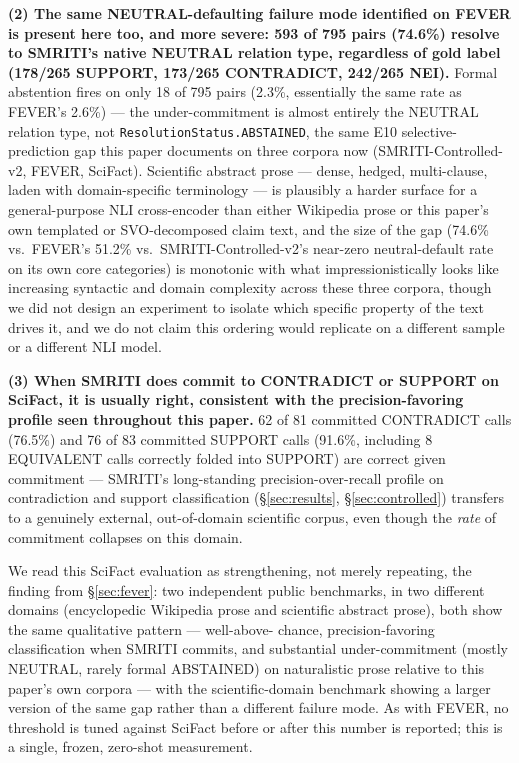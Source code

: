 \textbf{(2) The same NEUTRAL-defaulting failure mode identified on FEVER
is present here too, and more severe: 593 of 795 pairs (74.6\%) resolve
to SMRITI's native NEUTRAL relation type, regardless of gold label
(178/265 SUPPORT, 173/265 CONTRADICT, 242/265 NEI).} Formal abstention
fires on only 18 of 795 pairs (2.3\%, essentially the same rate as
FEVER's 2.6\%) --- the under-commitment is almost entirely the NEUTRAL
relation type, not \texttt{ResolutionStatus.ABSTAINED}, the same E10
selective-prediction gap this paper documents on three corpora now
(SMRITI-Controlled-v2, FEVER, SciFact). Scientific abstract prose ---
dense, hedged, multi-clause, laden with domain-specific terminology --- is
plausibly a harder surface for a general-purpose NLI cross-encoder than
either Wikipedia prose or this paper's own templated or SVO-decomposed
claim text, and the size of the gap (74.6\% vs.\ FEVER's 51.2\% vs.\
SMRITI-Controlled-v2's near-zero neutral-default rate on its own core
categories) is monotonic with what impressionistically looks like
increasing syntactic and domain complexity across these three corpora,
though we did not design an experiment to isolate which specific
property of the text drives it, and we do not claim this ordering would
replicate on a different sample or a different NLI model.

\textbf{(3) When SMRITI does commit to CONTRADICT or SUPPORT on SciFact,
it is usually right, consistent with the precision-favoring profile seen
throughout this paper.} 62 of 81 committed CONTRADICT calls (76.5\%) and
76 of 83 committed SUPPORT calls (91.6\%, including 8 EQUIVALENT calls
correctly folded into SUPPORT) are correct given commitment --- SMRITI's
long-standing precision-over-recall profile on contradiction and support
classification (\S\ref{sec:results}, \S\ref{sec:controlled}) transfers to
a genuinely external, out-of-domain scientific corpus, even though the
\emph{rate} of commitment collapses on this domain.

We read this SciFact evaluation as strengthening, not merely repeating,
the finding from \S\ref{sec:fever}: two independent public benchmarks,
in two different domains (encyclopedic Wikipedia prose and scientific
abstract prose), both show the same qualitative pattern --- well-above-
chance, precision-favoring classification when SMRITI commits, and
substantial under-commitment (mostly NEUTRAL, rarely formal ABSTAINED)
on naturalistic prose relative to this paper's own corpora --- with the
scientific-domain benchmark showing a larger version of the same gap
rather than a different failure mode. As with FEVER, no threshold is
tuned against SciFact before or after this number is reported; this is a
single, frozen, zero-shot measurement.

